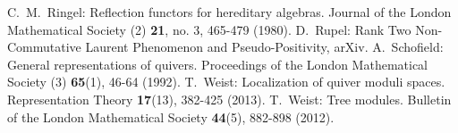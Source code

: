 \documentclass{amsart}
\numberwithin{equation}{section}
\begin{document}
\begin{thebibliography}{10}
  C.~M.~Ringel: Reflection functors for hereditary algebras. Journal of the London Mathematical Society (2) {\bf 21}, no. 3, 465-479 (1980).
  D.~Rupel: Rank Two Non-Commutative Laurent Phenomenon and Pseudo-Positivity, arXiv.
  A.~Schofield: General representations of quivers. Proceedings of the London Mathematical Society (3) \textbf{65}(1), 46-64 (1992).
  T.~Weist: Localization of quiver moduli spaces. Representation Theory \textbf{17}(13), 382-425 (2013).
  T.~Weist: Tree modules. Bulletin of the London Mathematical Society \textbf{44}(5), 882-898 (2012).
\end{thebibliography}
\end{document}
